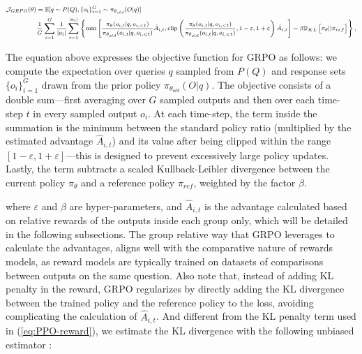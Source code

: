 \begin{itemize}[topsep=0pt]
\begin{itemize}[topsep=0pt]
\begin{equation}
\footnotesize
\begin{split}
    \mathcal{J}_{GRPO}(\theta) &= \mathbb{E}{[q \sim P(Q), \{o_i\}_{i=1}^G \sim \pi_{\theta_{old}}(O|q)]}  \\
    & \frac{1}{G}\sum_{i=1}^G\frac{1}{|o_i|} \sum_{t=1}^{|o_i|} \left\{ \min \left[ \frac{\pi_\theta(o_{i,t} | q, o_{i,<t})}{\pi_{\theta_{old}}(o_{i,t} | q, o_{i,<t})} \hat{A}_{i,t}, \text{clip} \left( \frac{\pi_\theta(o_{i,t} | q, o_{i,<t})}{\pi_{\theta_{old}}(o_{i,t} | q, o_{i,<t})}, 1 - \varepsilon, 1 + \varepsilon \right)  \hat{A}_{i,t} \right] - \beta \mathbb{D}_{KL}\left[\pi_{\theta} || \pi_{ref}\right]\right\} ,
\end{split}
\label{eq:GRPO-obj}
\end{equation}

The equation above expresses the objective function for GRPO as follows: we compute the expectation over queries $q$ sampled from $P(Q)$ and response sets $\{o_i\}_{i=1}^G$ drawn from the prior policy $\pi_{\theta_{old}}(O|q)$. The objective consists of a double sum—first averaging over $G$ sampled outputs and then over each time-step $t$ in every sampled output $o_i$. At each time-step, the term inside the summation is the minimum between the standard policy ratio (multiplied by the estimated advantage $\hat{A}_{i,t}$) and its value after being clipped within the range $[1-\varepsilon, 1+\varepsilon]$—this is designed to prevent excessively large policy updates. Lastly, the term subtracts a scaled Kullback-Leibler divergence between the current policy $\pi_\theta$ and a reference policy $\pi_{ref}$, weighted by the factor $\beta$.

where $\varepsilon$ and $\beta$ are hyper-parameters, and $\hat{A}_{i,t}$  is the advantage calculated based on relative rewards of the outputs inside each group only, which will be detailed in the following subsections. The group relative way that GRPO leverages to calculate the advantages, aligns well with the comparative nature of rewards models,  as reward models are typically trained on datasets of comparisons between outputs on the same question. Also note that, instead of adding KL penalty in the reward, GRPO regularizes by directly adding the KL divergence between the trained policy and the reference policy to the loss, avoiding complicating the calculation of  $\hat{A}_{i,t}$. And different from the KL penalty term used in (\ref{eq:PPO-reward}), we estimate the KL divergence with the following unbiased estimator \citep{kl_approx}:


\end{itemize}
\end{itemize}

